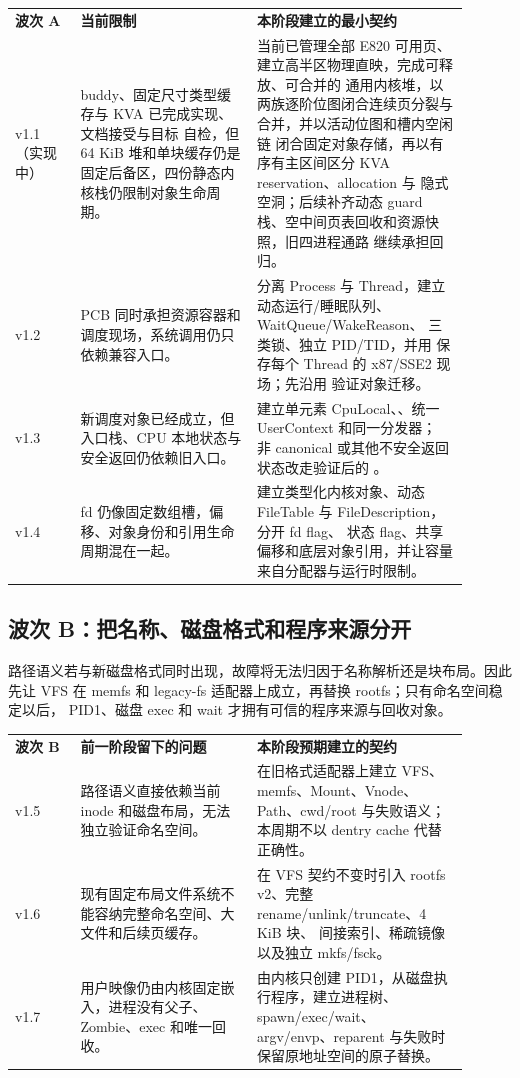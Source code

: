 \begin{longtable}{|L{0.13\linewidth}|L{0.35\linewidth}|L{0.42\linewidth}|}
\hline
{}
\textbf{波次 A} & \textbf{当前限制} & \textbf{本阶段建立的最小契约} \\\tablerowrule
\endhead
v1.1（实现中） & buddy、固定尺寸类型缓存与 KVA 已完成实现、文档接受与目标
自检，但 64 KiB 堆和单块缓存仍是固定后备区，四份静态内核栈仍限制对象生命周期。 &
当前已管理全部 E820 可用页、建立高半区物理直映，完成可释放、可合并的
通用内核堆，以两族逐阶位图闭合连续页分裂与合并，并以活动位图和槽内空闲链
闭合固定对象存储，再以有序有主区间区分 KVA reservation、allocation 与
隐式空洞；后续补齐动态 guard 栈、空中间页表回收和资源快照，旧四进程通路
继续承担回归。
\\\tablerowrule
v1.2 & PCB 同时承担资源容器和调度现场，系统调用仍只依赖兼容入口。 &
分离 Process 与 Thread，建立动态运行/睡眠队列、WaitQueue/WakeReason、
三类锁、独立 PID/TID，并用  保存每个 Thread 的
x87/SSE2 现场；先沿用  验证对象迁移。 \\\tablerowrule
v1.3 & 新调度对象已经成立，但入口栈、CPU 本地状态与安全返回仍依赖旧入口。 &
建立单元素 CpuLocal、、统一 UserContext 和同一分发器；
非 canonical 或其他不安全返回状态改走验证后的 。 \\\tablerowrule
v1.4 & fd 仍像固定数组槽，偏移、对象身份和引用生命周期混在一起。 &
建立类型化内核对象、动态 FileTable 与 FileDescription，分开 fd flag、
状态 flag、共享偏移和底层对象引用，并让容量来自分配器与运行时限制。 \\\hline
\end{longtable}

\subsection*{波次 B：把名称、磁盘格式和程序来源分开}

路径语义若与新磁盘格式同时出现，故障将无法归因于名称解析还是块布局。因此先让
VFS 在 memfs 和 legacy-fs 适配器上成立，再替换 rootfs；只有命名空间稳定以后，
PID1、磁盘 exec 和 wait 才拥有可信的程序来源与回收对象。

\begin{longtable}{|L{0.13\linewidth}|L{0.35\linewidth}|L{0.42\linewidth}|}
\hline
{}
\textbf{波次 B} & \textbf{前一阶段留下的问题} & \textbf{本阶段预期建立的契约} \\\tablerowrule
\endhead
v1.5 & 路径语义直接依赖当前 inode 和磁盘布局，无法独立验证命名空间。 &
在旧格式适配器上建立 VFS、memfs、Mount、Vnode、Path、cwd/root 与失败语义；
本周期不以 dentry cache 代替正确性。 \\\tablerowrule
v1.6 & 现有固定布局文件系统不能容纳完整命名空间、大文件和后续页缓存。 &
在 VFS 契约不变时引入 rootfs v2、完整 rename/unlink/truncate、4 KiB 块、
间接索引、稀疏镜像以及独立 mkfs/fsck。 \\\tablerowrule
v1.7 & 用户映像仍由内核固定嵌入，进程没有父子、Zombie、exec 和唯一回收。 &
由内核只创建 PID1，从磁盘执行程序，建立进程树、spawn/exec/wait、
argv/envp、reparent 与失败时保留原地址空间的原子替换。 \\\hline
\end{longtable}

